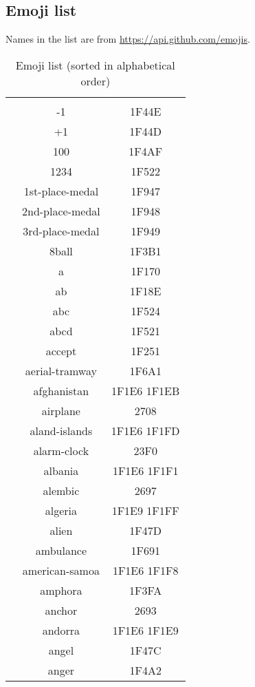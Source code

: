 \documentclass{l3doc}
\begin{document}
\subsection{ Emoji list}

Names in the list are from \url{https://api.github.com/emojis}.

\begingroup

\def\EMOJI#1#2{\emoji{#1} & #1 & {\ttcond\scriptsize#2} \\}
\def\HEAD{%
  \toprule
  \strong{Emoji} & \strong{Name} & \strong{Unicode codepoints} \\
  \midrule}
\small

\begin{longtable}{ccc}
    \caption{Emoji list (sorted in alphabetical order)}
    \label{tab:emoji-list} \\
    \HEAD
  \endfirsthead
    \HEAD
  \endhead
    \toprule
  \endfoot
    \EMOJI{-1}                                   {1F44E}
    \EMOJI{+1}                                   {1F44D}
    \EMOJI{100}                                  {1F4AF}
    \EMOJI{1234}                                 {1F522}
    \EMOJI{1st-place-medal}                      {1F947}
    \EMOJI{2nd-place-medal}                      {1F948}
    \EMOJI{3rd-place-medal}                      {1F949}
    \EMOJI{8ball}                                {1F3B1}
    \EMOJI{a}                                    {1F170}
    \EMOJI{ab}                                   {1F18E}
    \EMOJI{abc}                                  {1F524}
    \EMOJI{abcd}                                 {1F521}
    \EMOJI{accept}                               {1F251}
    \EMOJI{aerial-tramway}                       {1F6A1}
    \EMOJI{afghanistan}                          {1F1E6 1F1EB}
    \EMOJI{airplane}                             {2708}
    \EMOJI{aland-islands}                        {1F1E6 1F1FD}
    \EMOJI{alarm-clock}                          {23F0}
    \EMOJI{albania}                              {1F1E6 1F1F1}
    \EMOJI{alembic}                              {2697}
    \EMOJI{algeria}                              {1F1E9 1F1FF}
    \EMOJI{alien}                                {1F47D}
    \EMOJI{ambulance}                            {1F691}
    \EMOJI{american-samoa}                       {1F1E6 1F1F8}
    \EMOJI{amphora}                              {1F3FA}
    \EMOJI{anchor}                               {2693}
    \EMOJI{andorra}                              {1F1E6 1F1E9}
    \EMOJI{angel}                                {1F47C}
    \EMOJI{anger}                                {1F4A2}

\end{longtable}
\end{document}
